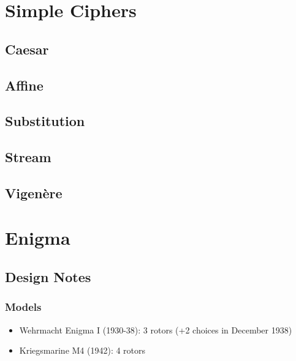 \documentclass{article}
\begin{document}

\section{Simple Ciphers}

\subsection{Caesar}

\subsection{Affine}

\subsection{Substitution}

\subsection{Stream}

\subsection{Vigenère}


\section{Enigma}

\subsection{Design Notes}

\subsubsection{Models}
\begin{itemize}
\item Wehrmacht Enigma I (1930-38): 3 rotors (+2 choices in December 1938)
\item Kriegsmarine M4 (1942): 4 rotors
\end{itemize}
\end{document}
